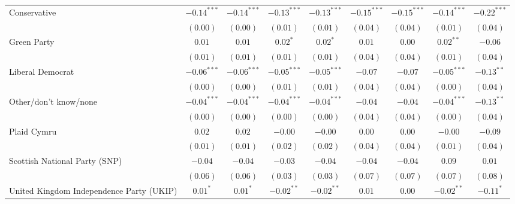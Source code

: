 \documentclass[12pt, letter]{scrartcl}
\begin{document}
\begin{tiny}
\begin{longtable}{lcccccccc}
Conservative                                & $-0.14^{***}$ & $-0.14^{***}$ & $-0.13^{***}$ & $-0.13^{***}$ & $-0.15^{***}$ & $-0.15^{***}$ & $-0.14^{***}$ & $-0.22^{***}$ \\
                                            & $(0.00)$      & $(0.00)$      & $(0.01)$      & $(0.01)$      & $(0.04)$      & $(0.04)$      & $(0.01)$      & $(0.04)$      \\
Green Party                                 & $0.01$        & $0.01$        & $0.02^{*}$    & $0.02^{*}$    & $0.01$        & $0.00$        & $0.02^{**}$   & $-0.06$       \\
                                            & $(0.01)$      & $(0.01)$      & $(0.01)$      & $(0.01)$      & $(0.04)$      & $(0.04)$      & $(0.01)$      & $(0.04)$      \\
Liberal Democrat                            & $-0.06^{***}$ & $-0.06^{***}$ & $-0.05^{***}$ & $-0.05^{***}$ & $-0.07$       & $-0.07$       & $-0.05^{***}$ & $-0.13^{**}$  \\
                                            & $(0.00)$      & $(0.00)$      & $(0.01)$      & $(0.01)$      & $(0.04)$      & $(0.04)$      & $(0.00)$      & $(0.04)$      \\
Other/don't know/none                       & $-0.04^{***}$ & $-0.04^{***}$ & $-0.04^{***}$ & $-0.04^{***}$ & $-0.04$       & $-0.04$       & $-0.04^{***}$ & $-0.13^{**}$  \\
                                            & $(0.00)$      & $(0.00)$      & $(0.00)$      & $(0.00)$      & $(0.04)$      & $(0.04)$      & $(0.00)$      & $(0.04)$      \\
Plaid Cymru                                 & $0.02$        & $0.02$        & $-0.00$       & $-0.00$       & $0.00$        & $0.00$        & $-0.00$       & $-0.09$       \\
                                            & $(0.01)$      & $(0.01)$      & $(0.02)$      & $(0.02)$      & $(0.04)$      & $(0.04)$      & $(0.01)$      & $(0.04)$      \\
Scottish National Party (SNP)               & $-0.04$       & $-0.04$       & $-0.03$       & $-0.04$       & $-0.04$       & $-0.04$       & $0.09$        & $0.01$        \\
                                            & $(0.06)$      & $(0.06)$      & $(0.03)$      & $(0.03)$      & $(0.07)$      & $(0.07)$      & $(0.07)$      & $(0.08)$      \\
United Kingdom Independence Party (UKIP)    & $0.01^{*}$    & $0.01^{*}$    & $-0.02^{**}$  & $-0.02^{**}$  & $0.01$        & $0.00$        & $-0.02^{**}$  & $-0.11^{*}$   \\

\end{longtable}
\end{tiny}
\end{document}
